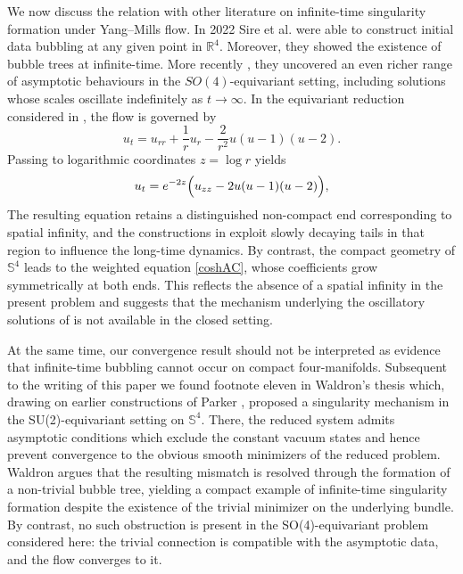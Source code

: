 \documentclass[11pt,a4paper]{article}
\numberwithin{equation}{section}
\theoremstyle{plain}
\theoremstyle{remark}
\begin{document}
We now discuss the relation with other literature on infinite-time singularity formation under Yang--Mills flow. In 2022 Sire et al. \cite{SireWeiZheng2022} were able to construct initial data bubbling at any given point in $\mathbb{R}^4$. Moreover, they showed the existence of bubble trees at infinite-time. More recently \cite{sire2026globaloscillatorysolutionsyangmills}, they uncovered an even richer range of asymptotic behaviours in the $SO(4)$-equivariant setting, including solutions whose scales oscillate indefinitely as $t\to\infty$. In the equivariant reduction considered in \cite{sire2026globaloscillatorysolutionsyangmills}, the flow is governed by
$$
u_t=u_{rr}+\frac1r u_r-\frac{2}{r^2}u(u-1)(u-2).
$$
Passing to logarithmic coordinates $z=\log r$ yields
$$
u_t=e^{-2z}\Bigl(u_{zz}-2u(u-1)(u-2)\Bigr),
$$
The resulting equation retains a distinguished non-compact end corresponding to spatial infinity, and the constructions in \cite{sire2026globaloscillatorysolutionsyangmills} exploit slowly decaying tails in that region to influence the long-time dynamics. By contrast, the compact geometry of $\mathbb{S}^4$ leads to the weighted equation \eqref{coshAC}, whose coefficients grow symmetrically at both ends. This reflects the absence of a spatial infinity in the present problem and suggests that the mechanism underlying the oscillatory solutions of \cite{sire2026globaloscillatorysolutionsyangmills} is not available in the closed setting.


At the same time, our convergence result should not be interpreted as evidence that infinite-time bubbling cannot occur on compact four-manifolds. Subsequent to the writing of this paper we found footnote eleven in Waldron's thesis \cite{Waldron2014Thesis} which, drawing on earlier constructions of Parker \cite{Parker1992NonMinimal}, proposed a singularity mechanism in the SU(2)-equivariant setting on $\mathbb S^4$. There, the reduced system admits asymptotic conditions which exclude the constant vacuum states and hence prevent convergence to the obvious smooth minimizers of the reduced problem. Waldron argues that the resulting mismatch is resolved through the formation of a non-trivial bubble tree, yielding a compact example of infinite-time singularity formation despite the existence of the trivial minimizer on the underlying bundle. By contrast, no such obstruction is present in the SO(4)-equivariant problem considered here: the trivial connection is compatible with the asymptotic data, and the flow converges to it.
\end{document}
